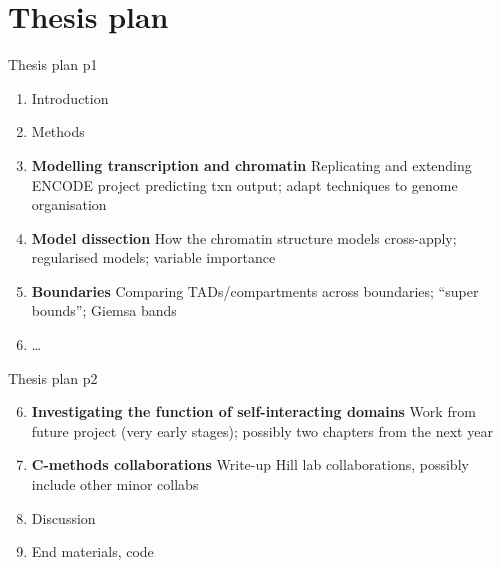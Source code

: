 \documentclass{beamer}
\begin{document}

\section{Thesis plan}
\begin{frame}{Thesis plan p1}
\begin{enumerate}
\item Introduction
\item Methods
\item {\bf Modelling transcription and chromatin} Replicating and
  extending ENCODE project predicting txn output; adapt techniques to
  genome organisation
\item {\bf Model dissection} How the chromatin structure models
  cross-apply; regularised models; variable importance
\item {\bf Boundaries} Comparing TADs/compartments across boundaries;
  ``super bounds''; Giemsa bands
\item \dots
\end{enumerate}

\end{frame}

\begin{frame}{Thesis plan p2}
\begin{enumerate}
\setcounter{enumi}{5}
\item {\bf Investigating the function of self-interacting domains}
  Work from future project (very early stages); possibly two chapters
  from the next year
\item {\bf C-methods collaborations} Write-up Hill lab collaborations,
  possibly include other minor collabs
\item Discussion
\item End materials, code
\end{enumerate}

\end{frame}
\end{document}
